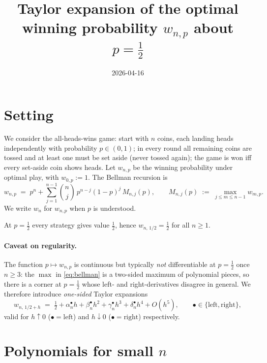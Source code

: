 \documentclass{article}
\title{Taylor expansion of the optimal winning probability $w_{n,p}$ about $p=\tfrac12$}
\author{}
\date{2026-04-16}
\theoremstyle{remark}
\begin{document}
\maketitle

\section{Setting}

We consider the all-heads-wins game: start with $n$ coins, each landing
heads independently with probability $p\in(0,1)$; in every round all
remaining coins are tossed and at least one must be set aside (never
tossed again); the game is won iff every set-aside coin shows heads. Let
$w_{n,p}$ be the winning probability under optimal play, with
$w_{0,p}:=1$. The Bellman recursion is
\begin{equation}\label{eq:bellman}
  w_{n,p}\;=\;p^{n}+\sum_{j=1}^{n-1}\binom{n}{j}\,p^{n-j}(1-p)^{j}\,
  M_{n,j}(p),
  \qquad M_{n,j}(p)\;:=\;\max_{j\le m\le n-1}w_{m,p}.
\end{equation}
We write $w_n$ for $w_{n,p}$ when $p$ is understood.

At $p=\tfrac12$ every strategy gives value $\tfrac12$, hence
$w_{n,\,1/2}=\tfrac12$ for all $n\ge 1$.

\paragraph{Caveat on regularity.}
The function $p\mapsto w_{n,p}$ is continuous but typically \emph{not}
differentiable at $p=\tfrac12$ once $n\ge3$: the $\max$ in
\eqref{eq:bellman} is a two-sided maximum of polynomial pieces, so there
is a corner at $p=\tfrac12$ whose left- and right-derivatives disagree in
general. We therefore introduce \emph{one-sided} Taylor expansions
\begin{equation}\label{eq:expansion}
  w_{n,\,1/2+h}\;=\;\tfrac12+\alpha_{n}^{\bullet}h+\beta_{n}^{\bullet}h^{2}
  +\gamma_{n}^{\bullet}h^{3}+\delta_{n}^{\bullet}h^{4}+O(h^{5}),
  \qquad \bullet\in\{\text{left},\text{right}\},
\end{equation}
valid for $h\uparrow 0$ ($\bullet=\text{left}$) and $h\downarrow 0$
($\bullet=\text{right}$) respectively.

\section{Polynomials for small $n$}
\end{document}
